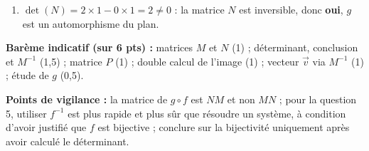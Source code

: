 \documentclass[11pt]{article}
\begin{document}
\begin{corrige}
\begin{enumerate}
\item $\det(N)=2\times1-0\times1=2\neq0$ : la matrice $N$ est inversible, donc \textbf{oui}, $g$ est un automorphisme du plan.
\end{enumerate}
\textbf{Barème indicatif (sur 6 pts) :} matrices $M$ et $N$ (1) ; déterminant, conclusion et $M^{-1}$ (1,5) ; matrice $P$ (1) ; double calcul de l'image (1) ; vecteur $\vec{v}$ via $M^{-1}$ (1) ; étude de $g$ (0,5).

\textbf{Points de vigilance :} la matrice de $g\circ f$ est $NM$ et non $MN$ ; pour la question 5, utiliser $f^{-1}$ est plus rapide et plus sûr que résoudre un système, à condition d'avoir justifié que $f$ est bijective ; conclure sur la bijectivité uniquement après avoir calculé le déterminant.
\end{corrige}
\end{document}
